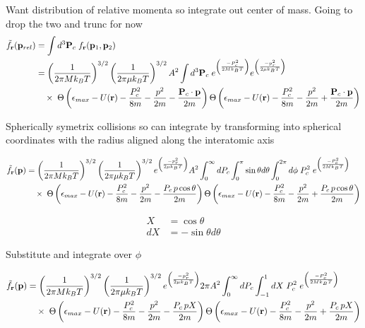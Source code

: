 Want distribution of relative momenta so integrate out center of mass. Going to drop the two and trunc for now
\begin{equation}
\begin{split}
	 \tilde{f}_{\mathbf{r}}(\mathbf{p}_{rel}) & = \int d^3 \mathbf{P}_c \; f_{\mathbf{r}} (\mathbf{p}_1, \mathbf{p}_2) \\
	 &= \left(\frac{1}{2 \pi M k_B T}\right)^{3/2} \left(\frac{1}{2 \pi \mu k_B T}\right)^{3/2} A^2 \int d^3 \mathbf{P}_c \; e^{\left(\frac{-P_c^2}{2 M k_B T}\right)} e^{\left(\frac{-p_r^2}{2 \mu k_B T}\right)} \\ 
	 &\quad \times \; \Theta \left( {\epsilon_{max} - U(\mathbf{r}) - \frac{P_c^2}{8m} - \frac{p^2}{2m} - \frac{\mathbf{P}_c \cdot \mathbf{p}}{2m}} \right) \Theta \left( {\epsilon_{max} - U(\mathbf{r}) - \frac{P_c^2}{8m} - \frac{p^2}{2m} + \frac{\mathbf{P}_c \cdot \mathbf{p}}{2m}} \right) 
\end{split}
\end{equation}

Spherically symetrix collisions so can integrate by transforming into spherical coordinates with the radius aligned along the interatomic axis

\begin{equation}
\begin{split}
	 \tilde{f}_{\mathbf{r}}(\mathbf{p}) &= \left(\frac{1}{2 \pi M k_B T}\right)^{3/2} \left(\frac{1}{2 \pi \mu k_B T}\right)^{3/2} e^{\left(\frac{-p_r^2}{2 \mu k_B T}\right)} A^2 \int_0^{\infty} dP_c \int_0^{\pi} \sin \theta d\theta \int_0^{2\pi} d\phi \; P_c^2 \; e^{\left(\frac{-P_c^2}{2 M k_B T}\right)} \\ 
	 &\quad \times \; \Theta \left( {\epsilon_{max} - U(\mathbf{r}) - \frac{P_c^2}{8m} - \frac{p^2}{2m} - \frac{P_c \, p \cos \theta}{2m}} \right) \Theta \left( {\epsilon_{max} - U(\mathbf{r}) - \frac{P_c^2}{8m} - \frac{p^2}{2m} + \frac{P_c \, p \cos \theta}{2m}} \right) 
\end{split}
\end{equation}

\begin{equation*}
\begin{split}
	X  &= \cos \theta \\
	dX &= - \sin \theta d \theta
\end{split}
\end{equation*}

Substitute and integrate over $\phi$

\begin{equation}
\begin{split}
	 \tilde{f}_{\mathbf{r}}(\mathbf{p}) &= \left(\frac{1}{2 \pi M k_B T}\right)^{3/2} \left(\frac{1}{2 \pi \mu k_B T}\right)^{3/2} e^{\left(\frac{-p_r^2}{2 \mu k_B T}\right)} 2 \pi A^2 \int_0^{\infty} dP_c \int_{-1}^1 dX \; P_c^2 \; e^{\left(\frac{-P_c^2}{2 M k_B T}\right)} \\ 
	 &\quad \times \; \Theta \left( {\epsilon_{max} - U(\mathbf{r}) - \frac{P_c^2}{8m} - \frac{p^2}{2m} - \frac{P_c \, p X}{2m}} \right) \Theta \left( {\epsilon_{max} - U(\mathbf{r}) - \frac{P_c^2}{8m} - \frac{p^2}{2m} + \frac{P_c \, p X}{2m}} \right) 
\end{split}
\end{equation}

